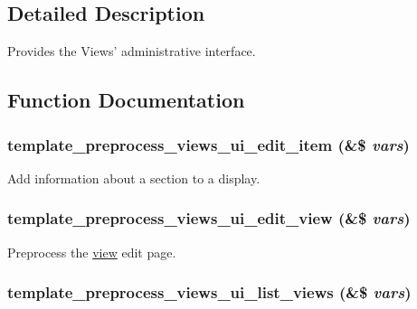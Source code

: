 \subsection{Detailed Description}
Provides the Views' administrative interface. 

\subsection{Function Documentation}
\hypertarget{admin_8inc_c6486b2b23fb04adda523126d8eb9a9f}{
\subsubsection[{template\_\-preprocess\_\-views\_\-ui\_\-edit\_\-item}]{\setlength{\rightskip}{0pt plus 5cm}template\_\-preprocess\_\-views\_\-ui\_\-edit\_\-item (\&\$ {\em vars})}}
\label{admin_8inc_c6486b2b23fb04adda523126d8eb9a9f}


Add information about a section to a display. \hypertarget{admin_8inc_6f6cfa8a399d4ef25d9dab8f370c90d3}{
\subsubsection[{template\_\-preprocess\_\-views\_\-ui\_\-edit\_\-view}]{\setlength{\rightskip}{0pt plus 5cm}template\_\-preprocess\_\-views\_\-ui\_\-edit\_\-view (\&\$ {\em vars})}}
\label{admin_8inc_6f6cfa8a399d4ef25d9dab8f370c90d3}


Preprocess the \hyperlink{classview}{view} edit page. \hypertarget{admin_8inc_e57b4aeb4a4c585ed098eec748cdee3f}{
\subsubsection[{template\_\-preprocess\_\-views\_\-ui\_\-list\_\-views}]{\setlength{\rightskip}{0pt plus 5cm}template\_\-preprocess\_\-views\_\-ui\_\-list\_\-views (\&\$ {\em vars})}}
\label{admin_8inc_e57b4aeb4a4c585ed098eec748cdee3f}


